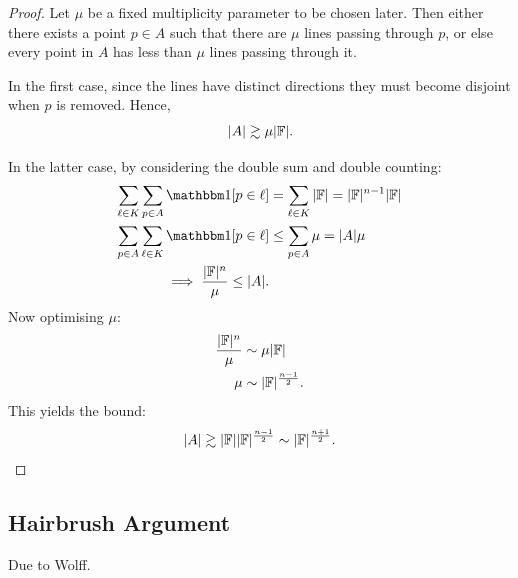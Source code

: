 \begin{proof}
    Let $\mu$ be a fixed multiplicity parameter to be chosen later. Then either there exists a point $p\in A$ such that there are $\mu$ lines passing through $p$,
    or else every point in $A$ has less than $\mu$ lines passing through it.

    In the first case, since the lines have distinct directions they must become disjoint when $p$ is removed. Hence,
    \[
      |A| \gtrsim \mu |\mathbb F| .
    \]

    In the latter case, by considering the double sum and double counting:
    \begin{align*}
         \sum_{\ell \in K} \sum_{p \in A} \OO[p \in \ell] &= \sum_{\ell \in K} |\FF| = |\FF|^{n-1} |\FF| \\
        \sum_{p \in A} \sum_{\ell \in K} \OO[p \in \ell] &\leq \sum_{p \in A} \mu = |A|\mu \\
        \implies \frac{|\FF|^{n}}{\mu} \leq |A|.
    \end{align*}
    Now optimising $\mu$:
    \begin{align*}
        \frac{|\mathbb F|^{n}}{\mu} &\sim \mu |\mathbb F| \\
        \mu &\sim |\mathbb F|^{\frac{n-1}{2}}.
    \end{align*}
    This yields the bound:
    \[
        |A| \gtrsim |\mathbb F||\mathbb F|^{\frac{n-1}{2}} \sim |\mathbb F|^{\frac{n+1}{2}}.
    \]

\end{proof}

\subsection{Hairbrush Argument}
Due to Wolff. \cite{WOLFF1995}

